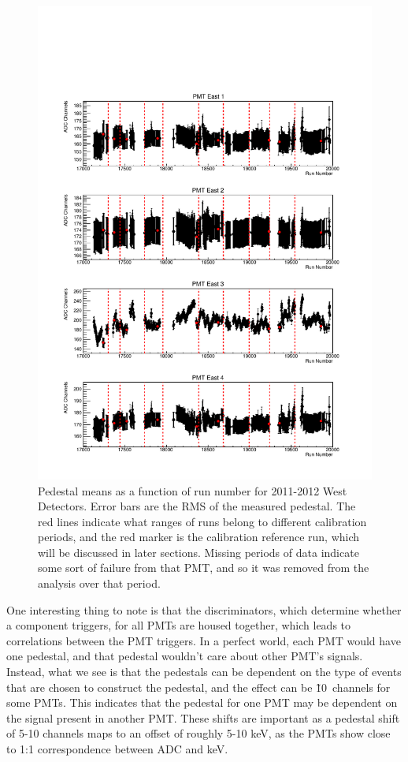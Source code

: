 \begin{figure}[p] 
\centering
\includegraphics[page=2,scale=0.8]{3-UCNAAnalysis/2011-2012_pedestals.pdf}
\caption{Pedestal means as a function of run number for 2011-2012 West Detectors. Error bars are the
  RMS of the measured pedestal. The red lines indicate what ranges of runs belong to
  different calibration periods, and the red marker is the calibration reference run,
  which will be discussed in later sections. Missing periods of data indicate some sort of failure
  from that PMT, and so it was removed from the analysis over that period.}
\label{fig:peds_timeDep}
\end{figure}

One interesting thing to note is that the discriminators, which determine whether
a component triggers,
for all PMTs are housed 
together, which leads to correlations between the PMT triggers. In a perfect world, 
each PMT would have one pedestal, and that pedestal wouldn't care about other PMT's signals.
Instead, what we see is that the pedestals
can be dependent on the type of events that are chosen 
to construct the pedestal, and the effect can be \~10~channels for some PMTs.
This indicates that the pedestal for one PMT may be dependent
on the signal present in another PMT. These shifts are important as a
pedestal shift of 5-10 channels maps to an offset of roughly
5-10 keV, as the PMTs show close to 1:1 correspondence between ADC and keV.

